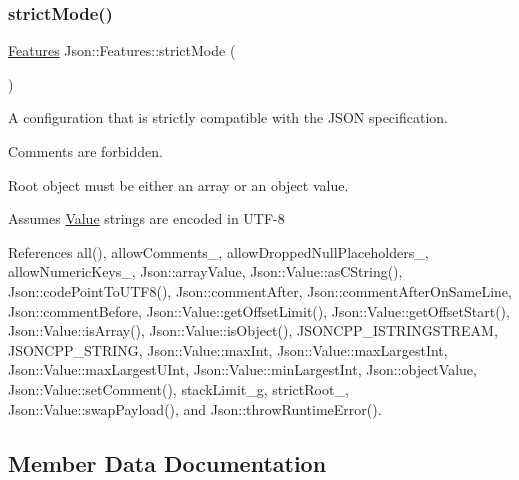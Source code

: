 \mbox{\label{classJson_1_1Features_ae23176c14b2e79e81fb61fb1a8ab58ee_ae23176c14b2e79e81fb61fb1a8ab58ee}} 
\subsubsection{\texorpdfstring{strict\+Mode()}{strictMode()}}
{\footnotesize\ttfamily \hyperlink{classJson_1_1Features}{Features} Json\+::\+Features\+::strict\+Mode (\begin{DoxyParamCaption}{ }\end{DoxyParamCaption})\hspace{0.3cm}{\ttfamily [static]}}



A configuration that is strictly compatible with the J\+S\+ON specification. 


\begin{DoxyItemize}
\item Comments are forbidden.
\item Root object must be either an array or an object value.
\item Assumes \hyperlink{classJson_1_1Value}{Value} strings are encoded in U\+T\+F-\/8 
\end{DoxyItemize}

References all(), allow\+Comments\+\_\+, allow\+Dropped\+Null\+Placeholders\+\_\+, allow\+Numeric\+Keys\+\_\+, Json\+::array\+Value, Json\+::\+Value\+::as\+C\+String(), Json\+::code\+Point\+To\+U\+T\+F8(), Json\+::comment\+After, Json\+::comment\+After\+On\+Same\+Line, Json\+::comment\+Before, Json\+::\+Value\+::get\+Offset\+Limit(), Json\+::\+Value\+::get\+Offset\+Start(), Json\+::\+Value\+::is\+Array(), Json\+::\+Value\+::is\+Object(), J\+S\+O\+N\+C\+P\+P\+\_\+\+I\+S\+T\+R\+I\+N\+G\+S\+T\+R\+E\+AM, J\+S\+O\+N\+C\+P\+P\+\_\+\+S\+T\+R\+I\+NG, Json\+::\+Value\+::max\+Int, Json\+::\+Value\+::max\+Largest\+Int, Json\+::\+Value\+::max\+Largest\+U\+Int, Json\+::\+Value\+::min\+Largest\+Int, Json\+::object\+Value, Json\+::\+Value\+::set\+Comment(), stack\+Limit\+\_\+g, strict\+Root\+\_\+, Json\+::\+Value\+::swap\+Payload(), and Json\+::throw\+Runtime\+Error().



\subsection{Member Data Documentation}
\mbox{\label{classJson_1_1Features_a33afd389719624b6bdb23950b3c346c9_a33afd389719624b6bdb23950b3c346c9}} 
